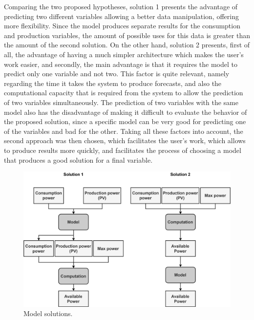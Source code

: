 Comparing the two proposed hypotheses, solution 1 presents the advantage of predicting two different variables allowing a better data manipulation, offering more flexibility. Since the model produces separate results for the consumption and production variables, the amount of possible uses for this data is greater than the amount of the second solution. On the other hand, solution 2 presents, first of all, the advantage of having a much simpler architecture which makes the user's work easier, and secondly, the main advantage is that it requires the model to predict only one variable and not two. This factor is quite relevant, namely regarding the time it takes the system to produce forecasts, and also the computational capacity that is required from the system to allow the prediction of two variables simultaneously. The prediction of two variables with the same model also has the disadvantage of making it difficult to evaluate the behavior of the proposed solution, since a specific model can be very good for predicting one of the variables and bad for the other. 
Taking all these factors into account, the second approach was then chosen, which facilitates the user's work, which allows to produce results more quickly, and facilitates the process of choosing a model that produces a good solution for a final variable.



\begin{figure}[h!]
    \centering
    \begin{center}
    \includegraphics[width=1\textwidth]{Images/Available.png}
    \caption{Model solutions.}
    \label{avsol}
    \end{center}
\end{figure}


